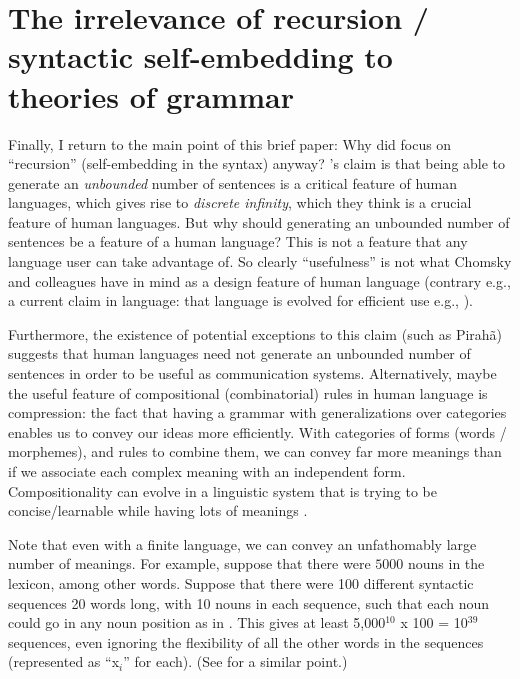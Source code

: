 \documentclass{article}
\begin{document}
\section{The irrelevance of recursion / syntactic self-embedding to theories of grammar}
\label{irrel_recursion_sec}

Finally,  I return to the main point of this brief paper: Why did \cite{hauser2002faculty} focus on ``recursion'' (self-embedding in the syntax) anyway?  \cite{hauser2002faculty}’s claim is that being able to generate an \textit{unbounded} number of sentences is a critical feature of human languages, which gives rise to \textit{discrete infinity}, which they think is a crucial feature of human languages.  But why should generating an unbounded number of sentences be a feature of a human language?  This is not a feature that any language user can take advantage of. So clearly ``usefulness'' is not what Chomsky and colleagues have in mind as a design feature of human language (contrary e.g., a current claim in language: that language is evolved for efficient use e.g., \cite{gibson2019efficiency}).

Furthermore, the existence of potential exceptions to this claim (such as Pirahã) suggests that human languages need not generate an unbounded number of sentences in order to be useful as communication systems. Alternatively, maybe the useful feature of compositional (combinatorial) rules in human language is compression: the fact that having a grammar with generalizations over categories enables us to convey our ideas more efficiently. With categories of forms (words / morphemes), and rules to combine them, we can convey far more meanings than if we associate each complex meaning with an independent form. Compositionality can evolve in a linguistic system that is trying to be concise/learnable while having lots of meanings \citep{kirby2000syntax}.


Note that even with a finite language, we can convey an unfathomably large number of meanings. For example, suppose that there were $5000$ nouns in the lexicon, among other words. Suppose that there were 100 different syntactic sequences 20 words long, with 10 nouns in each sequence, such that each noun could go in any noun position as in . This gives at least 5,000$^{10}$ x 100 = 10$^{39}$ sequences, even ignoring the flexibility of all the other words in the sequences (represented as ``x$_i$'' for each). (See \cite{muller2016grammatical} for a similar point.)
\end{document}
